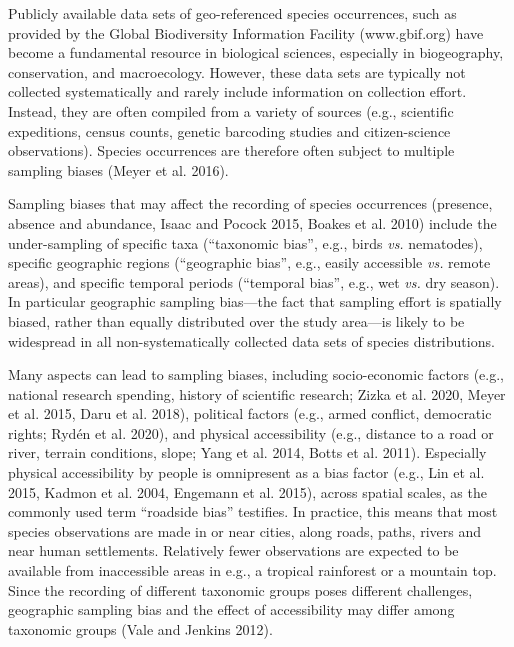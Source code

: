 \documentclass[
  12pt,
]{article}
\begin{document}
Publicly available data sets of geo-referenced species occurrences, such as provided by the Global Biodiversity Information Facility (www.gbif.org) have become a fundamental resource in biological sciences, especially in biogeography, conservation, and macroecology. However, these data sets are typically not collected systematically and rarely include information on collection effort. Instead, they are often compiled from a variety of sources (e.g., scientific expeditions, census counts, genetic barcoding studies and citizen-science observations). Species occurrences are therefore often subject to multiple sampling biases (Meyer et al. 2016).

Sampling biases that may affect the recording of species occurrences (presence, absence and abundance, Isaac and Pocock 2015, Boakes et al. 2010) include the under-sampling of specific taxa (``taxonomic bias'', e.g., birds \emph{vs.} nematodes), specific geographic regions (``geographic bias'', e.g., easily accessible \emph{vs.} remote areas), and specific temporal periods (``temporal bias'', e.g., wet \emph{vs.} dry season). In particular geographic sampling bias---the fact that sampling effort is spatially biased, rather than equally distributed over the study area---is likely to be widespread in all non-systematically collected data sets of species distributions.

Many aspects can lead to sampling biases, including socio-economic factors (e.g., national research spending, history of scientific research; Zizka et al. 2020, Meyer et al. 2015, Daru et al. 2018), political factors (e.g., armed conflict, democratic rights; Rydén et al. 2020), and physical accessibility (e.g., distance to a road or river, terrain conditions, slope; Yang et al. 2014, Botts et al. 2011). Especially physical accessibility by people is omnipresent as a bias factor (e.g., Lin et al. 2015, Kadmon et al. 2004, Engemann et al. 2015), across spatial scales, as the commonly used term ``roadside bias'' testifies. In practice, this means that most species observations are made in or near cities, along roads, paths, rivers and near human settlements. Relatively fewer observations are expected to be available from inaccessible areas in e.g., a tropical rainforest or a mountain top. Since the recording of different taxonomic groups poses different challenges, geographic sampling bias and the effect of accessibility may differ among taxonomic groups (Vale and Jenkins 2012).
\end{document}
